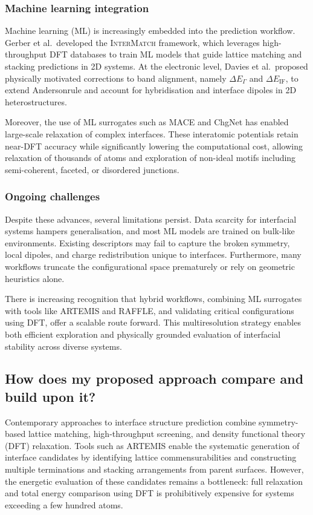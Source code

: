 \subsubsection{Machine learning integration}

Machine learning (ML) is increasingly embedded into the prediction workflow. Gerber et al.\ developed the \textsc{InterMatch} framework, which leverages high-throughput DFT databases to train ML models that guide lattice matching and stacking predictions in 2D systems. At the electronic level, Davies et al.\ proposed physically motivated corrections to band alignment, namely $\Delta E_\Gamma$ and $\Delta E_{\mathrm{IF}}$, to extend Anderson\rqss rule and account for hybridisation and interface dipoles in 2D heterostructures.

Moreover, the use of ML surrogates such as MACE and ChgNet has enabled large-scale relaxation of complex interfaces. These interatomic potentials retain near-DFT accuracy while significantly lowering the computational cost, allowing relaxation of thousands of atoms and exploration of non-ideal motifs including semi-coherent, faceted, or disordered junctions.

\subsubsection{Ongoing challenges}

Despite these advances, several limitations persist. Data scarcity for interfacial systems hampers generalisation, and most ML models are trained on bulk-like environments. Existing descriptors may fail to capture the broken symmetry, local dipoles, and charge redistribution unique to interfaces. Furthermore, many workflows truncate the configurational space prematurely or rely on geometric heuristics alone.

There is increasing recognition that hybrid workflows, combining ML surrogates with tools like \textsc{ARTEMIS} and \textsc{RAFFLE}, and validating critical configurations using DFT, offer a scalable route forward. This multiresolution strategy enables both efficient exploration and physically grounded evaluation of interfacial stability across diverse systems.

\subsection{How does my proposed approach compare and build upon it?}

Contemporary approaches to interface structure prediction combine symmetry-based lattice matching, high-throughput screening, and density functional theory (DFT) relaxation. Tools such as \textsc{ARTEMIS} enable the systematic generation of interface candidates by identifying lattice commensurabilities and constructing multiple terminations and stacking arrangements from parent surfaces. However, the energetic evaluation of these candidates remains a bottleneck: full relaxation and total energy comparison using DFT is prohibitively expensive for systems exceeding a few hundred atoms.

